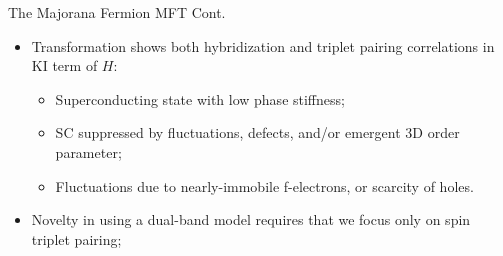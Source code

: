 \documentclass{beamer}
\begin{document}
\begin{frame}{The Majorana Fermion MFT Cont.}
    
    \begin{itemize}
        \item Transformation shows both hybridization and triplet pairing correlations in KI term of $H$:
        \begin{itemize}
            \item Superconducting state with low phase
            stiffness;
            
            \item SC suppressed by fluctuations, defects, and/or emergent 3D order parameter;
            
            \item Fluctuations due to nearly-immobile f-electrons, or scarcity of holes. 
        
        \end{itemize}
        
        \item Novelty in using a dual-band model requires that we focus only on spin triplet pairing;
    \end{itemize}
    
\end{frame}


\end{document}
